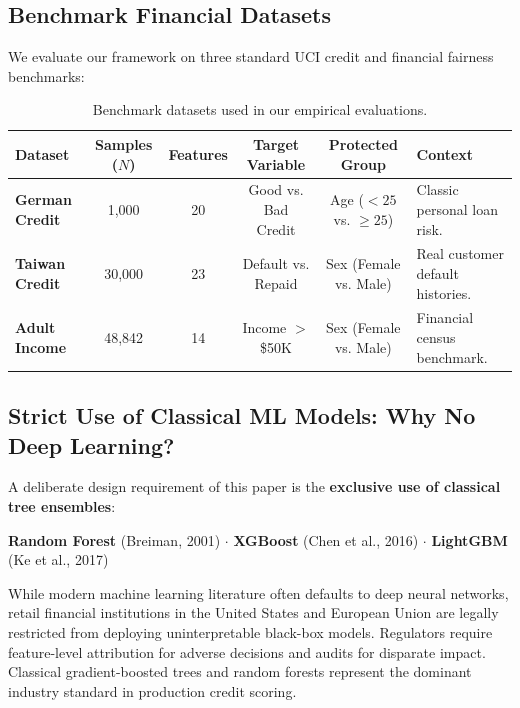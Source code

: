 \documentclass[11pt,a4paper]{article}
\begin{document}
\subsection{Benchmark Financial Datasets}
We evaluate our framework on three standard UCI credit and financial fairness benchmarks:
\begin{table}[htbp]
\centering
\small
\begin{tabularx}{\textwidth}{@{}lccccX@{}}
\toprule
\textbf{Dataset} & \textbf{Samples ($N$)} & \textbf{Features} & \textbf{Target Variable} & \textbf{Protected Group} & \textbf{Context} \\
\midrule
\textbf{German Credit} & 1,000 & 20 & Good vs. Bad Credit & Age ($<25$ vs. $\ge 25$) & Classic personal loan risk. \\
\textbf{Taiwan Credit} & 30,000 & 23 & Default vs. Repaid & Sex (Female vs. Male) & Real customer default histories. \\
\textbf{Adult Income} & 48,842 & 14 & Income $>$\$50K & Sex (Female vs. Male) & Financial census benchmark. \\
\bottomrule
\end{tabularx}
\caption{Benchmark datasets used in our empirical evaluations.}
\end{table}

\subsection{Strict Use of Classical ML Models: Why No Deep Learning?}
A deliberate design requirement of this paper is the \textbf{exclusive use of classical tree ensembles}:
\begin{center}
    \textbf{Random Forest} (Breiman, 2001) \quad $\cdot$ \quad \textbf{XGBoost} (Chen et al., 2016) \quad $\cdot$ \quad \textbf{LightGBM} (Ke et al., 2017)
\end{center}
While modern machine learning literature often defaults to deep neural networks, retail financial institutions in the United States and European Union are legally restricted from deploying uninterpretable black-box models. Regulators require feature-level attribution for adverse decisions and audits for disparate impact. Classical gradient-boosted trees and random forests represent the dominant industry standard in production credit scoring.
\end{document}
